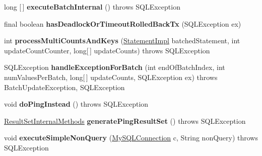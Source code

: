 \begin{DoxyCompactItemize}
long \mbox{[}$\,$\mbox{]} {\bfseries execute\+Batch\+Internal} ()  throws S\+Q\+L\+Exception 
\item 
\mbox{\label{classcom_1_1mysql_1_1jdbc_1_1_statement_impl_af8a6c125387bf1f6c36938ef2175d210}} 
final boolean {\bfseries has\+Deadlock\+Or\+Timeout\+Rolled\+Back\+Tx} (S\+Q\+L\+Exception ex)
\item 
\mbox{\label{classcom_1_1mysql_1_1jdbc_1_1_statement_impl_af11164c75dfec1fc7fdec29c5410b7b8}} 
int {\bfseries process\+Multi\+Counts\+And\+Keys} (\mbox{\hyperlink{classcom_1_1mysql_1_1jdbc_1_1_statement_impl}{Statement\+Impl}} batched\+Statement, int update\+Count\+Counter, long\mbox{[}$\,$\mbox{]} update\+Counts)  throws S\+Q\+L\+Exception 
\item 
\mbox{\label{classcom_1_1mysql_1_1jdbc_1_1_statement_impl_a53b7cc15f6dd1e1976b092cff725391d}} 
S\+Q\+L\+Exception {\bfseries handle\+Exception\+For\+Batch} (int end\+Of\+Batch\+Index, int num\+Values\+Per\+Batch, long\mbox{[}$\,$\mbox{]} update\+Counts, S\+Q\+L\+Exception ex)  throws Batch\+Update\+Exception, S\+Q\+L\+Exception 
\item 
\mbox{\label{classcom_1_1mysql_1_1jdbc_1_1_statement_impl_a8042c0bdf201f9ffbc34f61bf5a577ef}} 
void {\bfseries do\+Ping\+Instead} ()  throws S\+Q\+L\+Exception 
\item 
\mbox{\label{classcom_1_1mysql_1_1jdbc_1_1_statement_impl_aef2064324461402f0b2b2e5c15040ca8}} 
\mbox{\hyperlink{interfacecom_1_1mysql_1_1jdbc_1_1_result_set_internal_methods}{Result\+Set\+Internal\+Methods}} {\bfseries generate\+Ping\+Result\+Set} ()  throws S\+Q\+L\+Exception 
\item 
\mbox{\label{classcom_1_1mysql_1_1jdbc_1_1_statement_impl_a2a3005f5c5cfa0cbd745111e1ccfad1e}} 
void {\bfseries execute\+Simple\+Non\+Query} (\mbox{\hyperlink{interfacecom_1_1mysql_1_1jdbc_1_1_my_s_q_l_connection}{My\+S\+Q\+L\+Connection}} c, String non\+Query)  throws S\+Q\+L\+Exception 
\item 
\mbox{\label{classcom_1_1mysql_1_1jdbc_1_1_statement_impl_a221008fc40f680fca7a4325786bd4504}} 

\end{DoxyCompactItemize}
